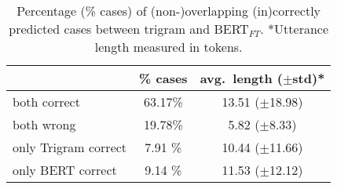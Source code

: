\begin{table}[H]
    \centering
    \begin{tabular}{@{}l  c  c @{}}
    \toprule
    \textbf{} & \textbf{\% cases} & \textbf{avg.\ length ($\pm$std)*}\\
    \midrule
    both correct & 63.17\% & 13.51 ($\pm$18.98) \\
    both wrong & 19.78\% & 5.82 ($\pm$8.33) \\
    only Trigram correct & 7.91 \% & 10.44 ($\pm$11.66) \\
    only BERT correct & 9.14 \% & 11.53 ($\pm$12.12) \\ \bottomrule
    \end{tabular}
    \caption{Percentage (\% cases) of (non-)overlapping (in)correctly predicted cases between trigram and BERT$_{FT}$. *Utterance length measured in tokens.}
    \label{tab:bnc_tri_bert_cases}
\end{table}


